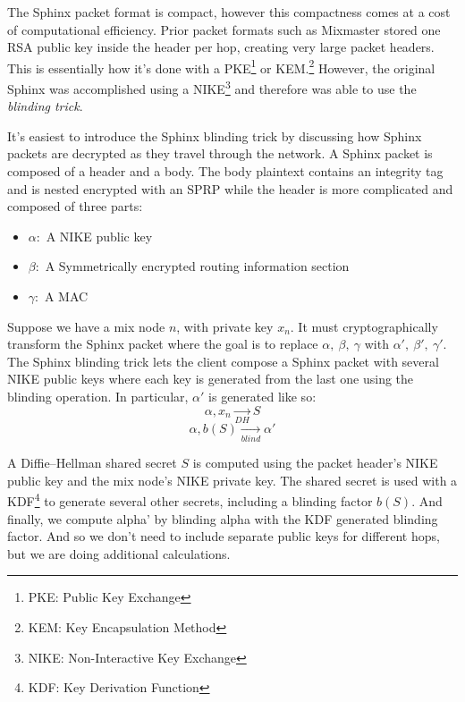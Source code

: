 \documentclass{article}
\begin{document}
The Sphinx packet format is compact, however this compactness comes at a cost of computational efficiency. Prior packet formats such as Mixmaster stored one RSA public key inside the header per hop, creating very large packet headers. This is essentially how it's done with a PKE\footnote{PKE: Public Key Exchange} or KEM.\footnote{KEM: Key Encapsulation Method} However, the original Sphinx was accomplished using a NIKE\footnote{NIKE: Non-Interactive Key Exchange} and therefore was able to use the \textit{blinding trick}.

\pagebreak
It's easiest to introduce the Sphinx blinding trick by discussing how Sphinx packets are decrypted as they travel through the network. A Sphinx packet is composed of a header and a body. The body plaintext contains an integrity tag and is nested encrypted with an SPRP while the header is more complicated and composed of three parts:

\begin{itemize}
    \item $\alpha:$ A NIKE public key
    \item $\beta:$ A Symmetrically encrypted routing information section
    \item $\gamma:$ A MAC
\end{itemize}

Suppose we have a mix node $n$, with private key $x_n$. It must cryptographically transform the Sphinx packet where the goal is to replace $\alpha,\ \beta,\ \gamma$ with $\alpha',\ \beta',\ \gamma'$. The Sphinx blinding trick lets the client compose a Sphinx packet with several NIKE public keys where each key  is generated from the last one using the blinding operation. In particular, $\alpha'$ is generated like so: $$\alpha, x_n \underset{DH}{\longrightarrow} S$$ $$\alpha,b(S)\underset{blind}{\longrightarrow} \alpha' $$

A Diffie–Hellman shared secret $S$ is computed using the packet header's NIKE public key and the mix node's NIKE private key. The shared secret is used with a KDF\footnote{KDF: Key Derivation Function} to generate several other secrets, including a blinding factor $b(S)$. And finally, we compute alpha' by blinding alpha with the KDF generated blinding factor. And so we don't need to include separate public keys for different hops, but we are doing additional calculations.
\end{document}

